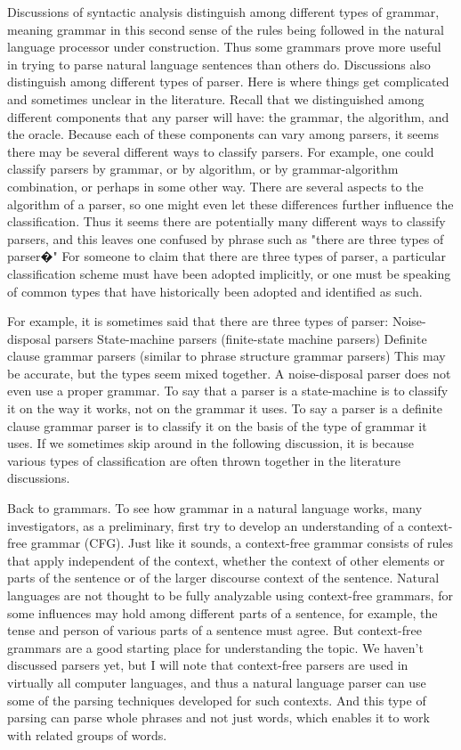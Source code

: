 Discussions of syntactic analysis distinguish among different types of grammar, meaning grammar in this second sense of the rules being followed in the natural language processor under construction. Thus some grammars prove more useful in trying to parse natural language sentences than others do. Discussions also distinguish among different types of parser. Here is where things get complicated and sometimes unclear in the literature. Recall that we distinguished among different components that any parser will have: the grammar, the algorithm, and the oracle. Because each of these components can vary among parsers, it seems there may be several different ways to classify parsers. For example, one could classify parsers by grammar, or by algorithm, or by grammar-algorithm combination, or perhaps in some other way. There are several aspects to the algorithm of a parser, so one might even let these differences further influence the classification. Thus it seems there are potentially many different ways to classify parsers, and this leaves one confused by phrase such as "there are three types of parser�" For someone to claim that there are three types of parser, a particular classification scheme must have been adopted implicitly, or one must be speaking of common types that have historically been adopted and identified as such.

For example, it is sometimes said that there are three types of parser:
Noise-disposal parsers
State-machine parsers (finite-state machine parsers)
Definite clause grammar parsers (similar to phrase structure grammar parsers)
This may be accurate, but the types seem mixed together. A noise-disposal parser does not even use a proper grammar. To say that a parser is a state-machine is to classify it on the way it works, not on the grammar it uses. To say a parser is a definite clause grammar parser is to classify it on the basis of the type of grammar it uses. If we sometimes skip around in the following discussion, it is because various types of classification are often thrown together in the literature discussions.

Back to grammars. To see how grammar in a natural language works, many investigators, as a preliminary, first try to develop an understanding of a context-free grammar (CFG). Just like it sounds, a context-free grammar consists of rules that apply independent of the context, whether the context of other elements or parts of the sentence or of the larger discourse context of the sentence. Natural languages are not thought to be fully analyzable using context-free grammars, for some influences may hold among different parts of a sentence, for example, the tense and person of various parts of a sentence must agree. But context-free grammars are a good starting place for understanding the topic. We haven't discussed parsers yet, but I will note that context-free parsers are used in virtually all computer languages, and thus a natural language parser can use some of the parsing techniques developed for such contexts. And this type of parsing can parse whole phrases and not just words, which enables it to work with related groups of words.


